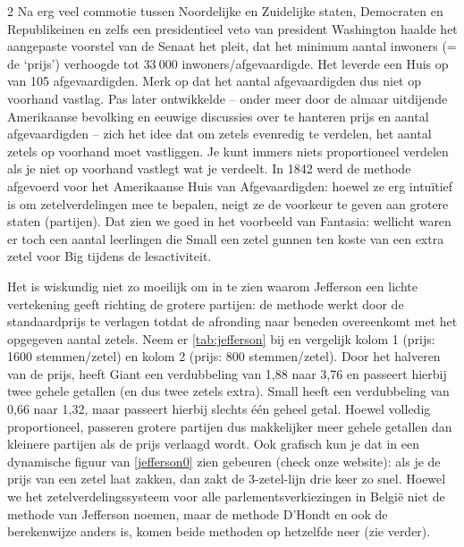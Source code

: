 \begin{multicols}{2}
Na erg veel commotie tussen Noordelijke en Zuidelijke staten, Democraten en Republikeinen en zelfs een presidentieel veto van president Washington haalde het aangepaste voorstel van de Senaat het pleit, dat het minimum aantal inwoners (= de `prijs') verhoogde tot $33~000$ inwoners/afgevaardigde. Het leverde een Huis op van 105 afgevaardigden. Merk op dat het aantal afgevaardigden dus niet op voorhand vastlag. Pas later ontwikkelde --  onder meer door de almaar uitdijende Amerikaanse bevolking en eeuwige discussies over te hanteren prijs en aantal afgevaardigden -- zich het idee dat om zetels evenredig te verdelen, het aantal zetels op voorhand moet vastliggen. Je kunt immers niets proportioneel verdelen als je niet op voorhand vastlegt wat je verdeelt. In 1842 werd de methode afgevoerd voor het Amerikaanse Huis van Afgevaardigden: hoewel ze erg intuïtief is om zetelverdelingen mee te bepalen, neigt ze de voorkeur te geven aan grotere staten (partijen). Dat zien we goed in het voorbeeld van Fantasia: wellicht waren er toch een aantal leerlingen die Small een zetel gunnen ten koste van een extra zetel voor Big tijdens de lesactiviteit. 

Het is wiskundig niet zo moeilijk om in te zien waarom Jefferson een lichte vertekening geeft richting de grotere partijen: de methode werkt door de standaardprijs te verlagen totdat de afronding naar beneden overeenkomt met het opgegeven aantal zetels. Neem er \autoref{tab:jefferson} bij en vergelijk kolom 1 (prijs: 1600 stemmen/zetel) en kolom 2 (prijs: 800 stemmen/zetel). Door het halveren van de prijs, heeft Giant een verdubbeling van 1,88 naar 3,76 en passeert hierbij twee gehele getallen (en dus twee zetels extra). Small heeft een verdubbeling van 0,66 naar 1,32, maar passeert hierbij slechts één geheel getal. Hoewel volledig proportioneel, passeren grotere partijen dus makkelijker meer gehele getallen dan kleinere partijen als de prijs verlaagd wordt. Ook grafisch kun je dat in een dynamische figuur van \autoref{jefferson0} zien gebeuren (check onze website): als je de prijs van een zetel laat  zakken, dan zakt de 3-zetel-lijn drie keer zo snel.
Hoewel we het zetelverdelingssysteem voor alle parlementsverkiezingen in België niet de methode van Jefferson noemen, maar de methode D'Hondt en ook de berekenwijze anders is, komen beide methoden op hetzelfde neer (zie verder).
\end{multicols} 
